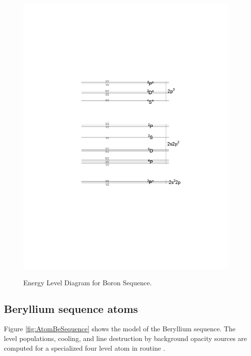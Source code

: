\begin{figure}
\centering
\includegraphics[scale=0.6]{AtomBoronSequence}
\label{fig:AtomBoronSequence}
\caption{Energy Level Diagram for Boron Sequence.}
\end{figure}

\subsection{Beryllium sequence atoms}

Figure \ref{fig:AtomBeSequence} shows the model of the Beryllium sequence.
The level populations, cooling, and line destruction by background opacity
sources are computed for a specialized four level atom in routine
.

